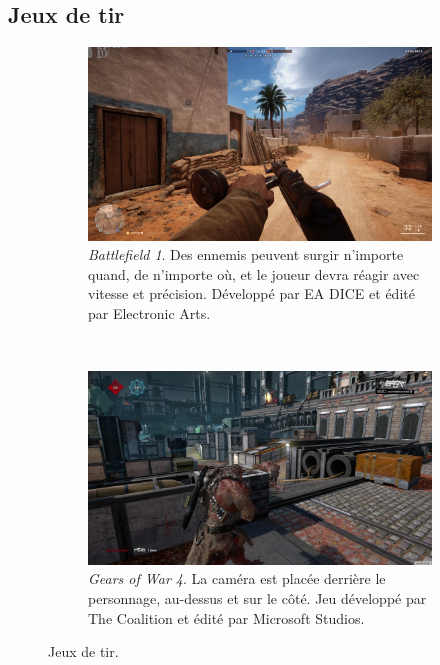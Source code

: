 \begin{appendices}
	\subsection{Jeux de tir}
	\begin{figure}[!htbp]
		\begin{subfigure}[t]{0.49\textwidth}
			\centering
			\includegraphics[width=\textwidth]{figures/ch1/bf1}
			\caption{\emph{Battlefield 1}. Des ennemis peuvent surgir n'importe quand, de n'importe où, et le joueur devra réagir avec vitesse et précision. Développé par EA DICE et édité par Electronic Arts.}
			\label{fig:bf1}
		\end{subfigure}
		~
		\begin{subfigure}[t]{0.49\textwidth}
			\centering
			\includegraphics[width=\textwidth]{figures/ch1/gears}
			\caption{\emph{Gears of War 4}. La caméra est placée derrière le personnage, au-dessus et sur le côté. Jeu développé par The Coalition et édité par Microsoft Studios.}
			\label{fig:gears}
		\end{subfigure}
		\caption{Jeux de tir.}
		\label{fig:shooters}
	\end{figure}
	

\end{appendices}

